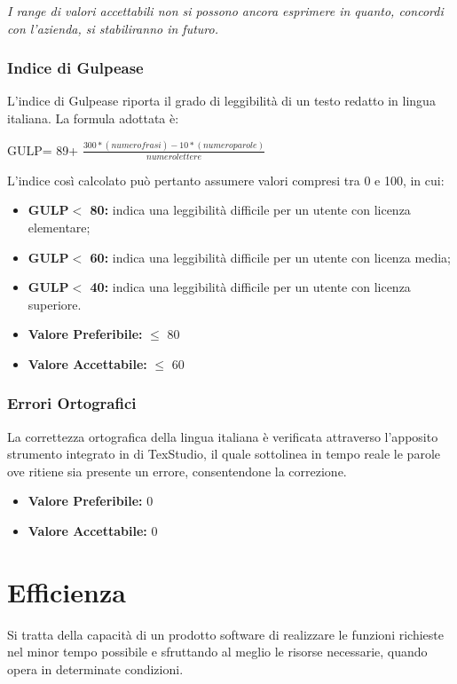 \textit{I range di valori accettabili non si possono ancora esprimere in quanto, concordi con l'azienda, si stabiliranno in futuro.}
\subsubsection{Indice di Gulpease} \label{3.3.1.2}
L’indice di Gulpease riporta il grado di leggibilità di un testo redatto in lingua italiana.
La formula adottata è:
\begin{center}
	GULP= 89+ $\frac{300*(numero frasi)-10*(numero parole)}{numero lettere}$
\end{center}
L'indice così calcolato può pertanto assumere valori compresi tra 0 e 100, in cui:
\begin{itemize}
	\item \textbf{GULP$<$ 80:} indica una leggibilità difficile per un utente con licenza elementare;
	\item \textbf{GULP$<$ 60:} indica una leggibilità difficile per un utente con licenza media;
	\item \textbf{GULP$<$ 40:} indica una leggibilità difficile per un utente con licenza superiore.
\end{itemize}
\begin{itemize}
	\item \textbf{Valore Preferibile:} $\leq$ 80 %
	\item \textbf{Valore  Accettabile:} $\leq$ 60
\end{itemize}
\subsubsection{Errori Ortografici} \label{3.3.1.3}
La correttezza ortografica della lingua italiana è verificata attraverso l’apposito strumento integrato in di TexStudio, il quale sottolinea in tempo reale le parole ove ritiene sia presente un errore, consentendone la correzione.
\begin{itemize}
	\item \textbf{Valore Preferibile:} 0
	\item \textbf{Valore  Accettabile:} 0
\end{itemize}

\section{Efficienza} \label{3.4}
Si tratta della capacità di un prodotto software di realizzare le funzioni richieste nel minor tempo possibile e sfruttando al meglio le risorse necessarie, quando opera in determinate condizioni. 
